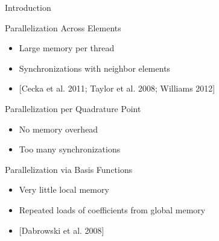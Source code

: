 \begin{frame}{Introduction}

 \begin{block}{Parallelization Across Elements}
  \begin{itemize}
   \item Large memory per thread
   \item Synchronizations with neighbor elements
   \item {\small [Cecka et al. 2011; Taylor et al. 2008; Williams 2012]}
  \end{itemize}
 \end{block}


 \begin{block}{Parallelization per Quadrature Point}
  \begin{itemize}
   \item No memory overhead
   \item Too many synchronizations
  \end{itemize}
 \end{block}

 \begin{block}{Parallelization via Basis Functions}
  \begin{itemize}
   \item Very little local memory
   \item Repeated loads of coefficients from global memory
   \item {\small [Dabrowski et al. 2008]}
  \end{itemize}
 \end{block}

\end{frame}
